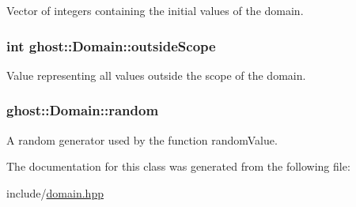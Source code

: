 Vector of integers containing the initial values of the domain. 

\hypertarget{classghost_1_1Domain_a057618072bec63bce85321dd413eb957}{
\subsubsection[{outside\-Scope}]{\setlength{\rightskip}{0pt plus 5cm}int ghost\-::\-Domain\-::outside\-Scope\hspace{0.3cm}{\ttfamily [private]}}}\label{classghost_1_1Domain_a057618072bec63bce85321dd413eb957}


Value representing all values outside the scope of the domain. 

\hypertarget{classghost_1_1Domain_a124992c8a2807afb606d0d27b34fba1a}{
\subsubsection[{random}]{ ghost\-::\-Domain\-::random\hspace{0.3cm}{\ttfamily [private]}}}\label{classghost_1_1Domain_a124992c8a2807afb606d0d27b34fba1a}


A random generator used by the function random\-Value. 



The documentation for this class was generated from the following file\-:\begin{DoxyCompactItemize}
\item 
include/\hyperlink{domain_8hpp}{domain.\-hpp}\end{DoxyCompactItemize}

